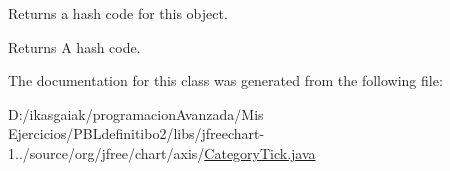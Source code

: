 Returns a hash code for this object.

\begin{DoxyReturn}{Returns}
A hash code. 
\end{DoxyReturn}


The documentation for this class was generated from the following file\+:\begin{DoxyCompactItemize}
\item 
D\+:/ikasgaiak/programacion\+Avanzada/\+Mis Ejercicios/\+P\+B\+Ldefinitibo2/libs/jfreechart-\/1../source/org/jfree/chart/axis/\mbox{\hyperlink{_category_tick_8java}{Category\+Tick.\+java}}\end{DoxyCompactItemize}

